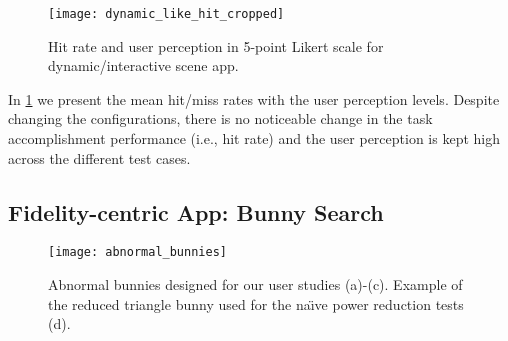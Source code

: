 \begin{figure}[t]
    \centering
    \vspace{-2ex}
    \texttt{[image: dynamic\_like\_hit\_cropped]}
    \vspace{-2ex}
    \caption{Hit rate and user perception in 5-point Likert scale for dynamic/interactive scene app.}
    \label{fig:user-dynamic-usability}
\end{figure}


In \fig\ref{fig:user-dynamic-usability} we present the mean hit/miss rates 
with the user perception levels. Despite changing the configurations,
there is no noticeable change in the task accomplishment performance 
(i.e., hit rate) and the user perception is kept high across the different test cases.
%






\subsection{Fidelity-centric App: Bunny Search}


\begin{figure}[t]
    \centering
    \texttt{[image: abnormal\_bunnies]}
    \vspace{-4ex}
    \caption{Abnormal bunnies designed for our user studies (a)-(c).
            Example of the reduced triangle bunny used for
            the na\"{\i}ve power reduction tests (d).}
    \label{fig:user-bunny}
\end{figure}


